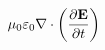 \documentclass[preview]{standalone}
\begin{document}
\begin{align*}
\mu_{0}\varepsilon_{0} \nabla \cdot \left(\pdv{\mathbf{E}}{t}\right)
\end{align*}
\end{document}
